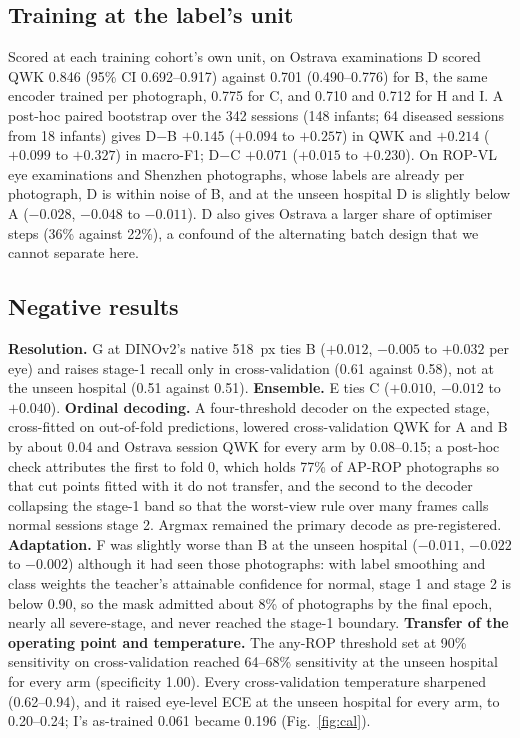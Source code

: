 \documentclass[conference]{IEEEtran}
\begin{document}
\subsection{Training at the label's unit}
Scored at each training cohort's own unit, on Ostrava examinations D scored QWK 0.846 (95\% CI 0.692--0.917) against 0.701 (0.490--0.776) for B, the same encoder trained per photograph, 0.775 for C, and 0.710 and 0.712 for H and I. A post-hoc paired bootstrap over the 342 sessions (148 infants; 64 diseased sessions from 18 infants) gives D$-$B $+0.145$ ($+0.094$ to $+0.257$) in QWK and $+0.214$ ($+0.099$ to $+0.327$) in macro-F1; D$-$C $+0.071$ ($+0.015$ to $+0.230$). On ROP-VL eye examinations and Shenzhen photographs, whose labels are already per photograph, D is within noise of B, and at the unseen hospital D is slightly below A ($-0.028$, $-0.048$ to $-0.011$). D also gives Ostrava a larger share of optimiser steps (36\% against 22\%), a confound of the alternating batch design that we cannot separate here.

\subsection{Negative results}
\textbf{Resolution.} G at DINOv2's native 518~px ties B ($+0.012$, $-0.005$ to $+0.032$ per eye) and raises stage-1 recall only in cross-validation (0.61 against 0.58), not at the unseen hospital (0.51 against 0.51). \textbf{Ensemble.} E ties C ($+0.010$, $-0.012$ to $+0.040$). \textbf{Ordinal decoding.} A four-threshold decoder on the expected stage, cross-fitted on out-of-fold predictions, lowered cross-validation QWK for A and B by about 0.04 and Ostrava session QWK for every arm by 0.08--0.15; a post-hoc check attributes the first to fold 0, which holds 77\% of AP-ROP photographs so that cut points fitted with it do not transfer, and the second to the decoder collapsing the stage-1 band so that the worst-view rule over many frames calls normal sessions stage 2. Argmax remained the primary decode as pre-registered. \textbf{Adaptation.} F was slightly worse than B at the unseen hospital ($-0.011$, $-0.022$ to $-0.002$) although it had seen those photographs: with label smoothing and class weights the teacher's attainable confidence for normal, stage 1 and stage 2 is below 0.90, so the mask admitted about 8\% of photographs by the final epoch, nearly all severe-stage, and never reached the stage-1 boundary. \textbf{Transfer of the operating point and temperature.} The any-ROP threshold set at 90\% sensitivity on cross-validation reached 64--68\% sensitivity at the unseen hospital for every arm (specificity 1.00). Every cross-validation temperature sharpened (0.62--0.94), and it raised eye-level ECE at the unseen hospital for every arm, to 0.20--0.24; I's as-trained 0.061 became 0.196 (Fig.~\ref{fig:cal}).
\end{document}
